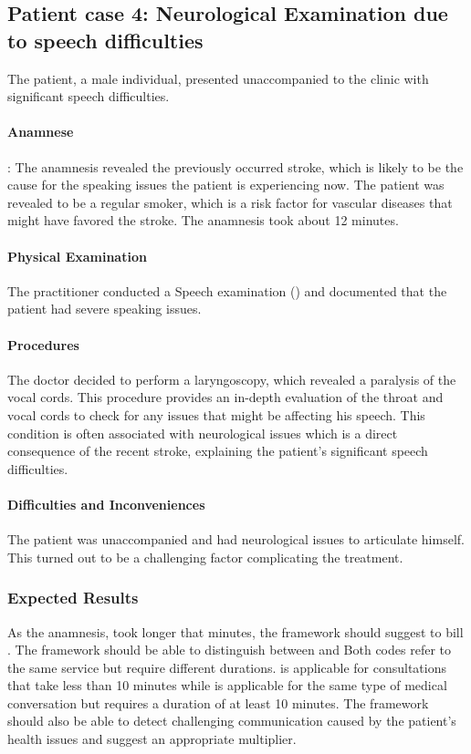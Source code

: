 \subsection{Patient case 4: Neurological Examination due to speech difficulties}\label{subsec:patient-case-4:-neurological-examination-due-to-speech-difficulties}
The patient, a male individual, presented unaccompanied to the clinic with significant speech difficulties.

\paragraph{Anamnese}:
The anamnesis revealed the previously occurred stroke, which is likely to be the cause for the speaking issues the patient is experiencing now.
The patient was revealed to be a regular smoker, which is a risk factor for vascular diseases that might have favored the stroke.
The anamnesis took about 12 minutes.

\paragraph{Physical Examination}
The practitioner conducted a Speech examination () and documented that the patient had severe speaking issues.

\paragraph{Procedures}
The doctor decided to perform a laryngoscopy, which revealed a paralysis of the vocal cords.
This procedure provides an in-depth evaluation of the throat and vocal cords to check for any issues that might be affecting his speech.
This condition is often associated with neurological issues which is a direct consequence of the recent stroke,
explaining the patient's significant speech difficulties.

\paragraph{Difficulties and Inconveniences}
The patient was unaccompanied and had neurological issues to articulate himself.
This turned out to be a challenging factor complicating the treatment.

\subsubsection{Expected Results}
As the anamnesis, took longer that  minutes, the framework should suggest to bill .
The framework should be able to distinguish between  and 
Both codes refer to the same service but require different durations.
 is applicable for consultations that take less than 10 minutes while  is applicable for the same type of medical conversation but requires a duration of at least 10 minutes.
The framework should also be able to detect challenging communication caused by the patient's health issues and suggest an appropriate multiplier.

